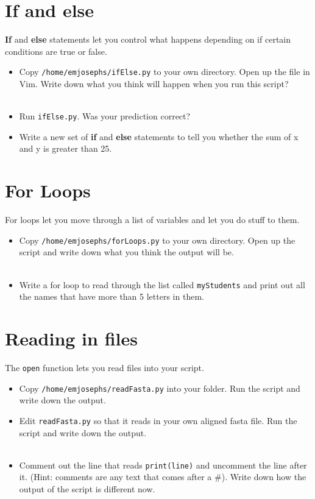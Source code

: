 \documentclass[11pt]{article}
\begin{document}
\section*{If and else}
\textbf{If} and \textbf{else} statements let you control what happens depending on if certain conditions are true or false.
\begin{itemize}
  \item Copy \texttt{/home/emjosephs/ifElse.py} to your own directory. Open up the file in Vim. Write down what you think will happen when you run this script?\\
    \\
  \item Run \texttt{ifElse.py}. Was your prediction correct? \\
  \item Write a new set of \textbf{if} and \textbf{else} statements to tell you whether the sum of x and y is greater than 25. \\
\end{itemize}

\section*{For Loops}
For loops let you move through a list of variables and let you do stuff to them.
\begin{itemize}
\item Copy \texttt{/home/emjosephs/forLoops.py} to your own directory. Open up the script and write down what you think the output will be. \\
  \\
\item Write a for loop to read through the list called \texttt{myStudents} and print out all the names that have more than 5 letters in them.
\end{itemize} 

  \section*{Reading in files}
  The \texttt{open} function lets you read files into your script. \\

  \begin{itemize}
  \item Copy \texttt{/home/emjosephs/readFasta.py} into your folder. Run the script and write down the output. \\
  \item Edit \texttt{readFasta.py} so that it reads in your own aligned fasta file. Run the script and write down the output. \\
    \\
    \item Comment out the line that reads \texttt{print(line)} and uncomment the line after it. (Hint: comments are any text that comes after a \#). Write down how the output of the script is different now.

\end{itemize}
\end{document}
